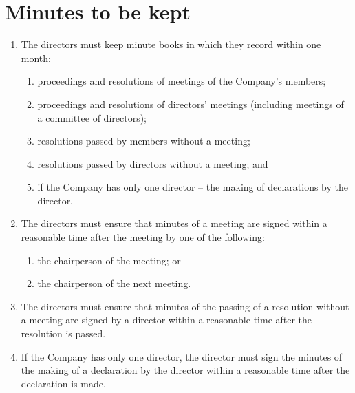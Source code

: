 \section{Minutes to be kept}

\begin{enumerate}[label=(\alph*)]
    \item The directors must keep minute books in which they record within one month:
    \begin{enumerate}[label=(\roman*)]
        \item proceedings and resolutions of meetings of the Company's members;
        \item proceedings and resolutions of directors' meetings (including meetings of a committee of directors);
        \item resolutions passed by members without a meeting;
        \item resolutions passed by directors without a meeting; and
        \item if the Company has only one director – the making of declarations by the director.
    \end{enumerate}
    
    \item The directors must ensure that minutes of a meeting are signed within a reasonable time after the meeting by one of the following:
    \begin{enumerate}[label=(\roman*)]
        \item the chairperson of the meeting; or
        \item the chairperson of the next meeting.
    \end{enumerate}
    
    \item The directors must ensure that minutes of the passing of a resolution without a meeting are signed by a director within a reasonable time after the resolution is passed.
    
    \item If the Company has only one director, the director must sign the minutes of the making of a declaration by the director within a reasonable time after the declaration is made.
    

\end{enumerate}
